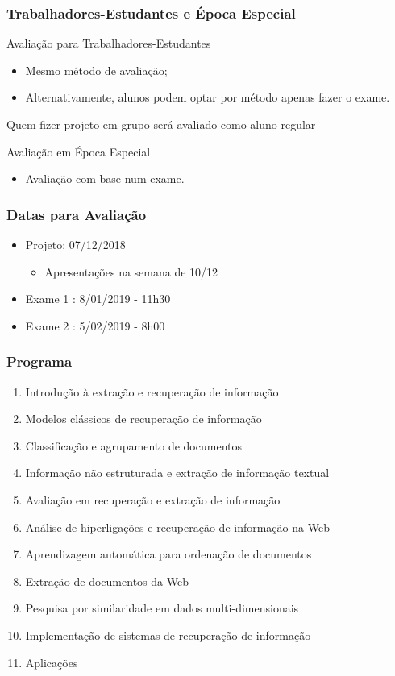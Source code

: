 \documentclass{beamer}
\begin{document}
\begin{frame} 
    \frametitle{Trabalhadores-Estudantes e Época Especial} 
   \begin{block}{Avaliação para Trabalhadores-Estudantes}
   \begin{itemize}
    \item Mesmo método de avaliação;
	\item Alternativamente, alunos podem optar por método apenas fazer o exame.
   \end{itemize}
   Quem fizer projeto em grupo será avaliado como aluno regular
   \end{block}
   \begin{block}{Avaliação em Época Especial}
   \begin{itemize}
   \item Avaliação com base num exame.
   \end{itemize}
   \end{block}
\end{frame}

\begin{frame} 
    \frametitle{Datas para Avaliação}
    \begin{itemize}
	\item Projeto: 07/12/2018
        \begin{itemize}
        \item Apresentações na semana de 10/12
        \end{itemize}
    \item Exame 1 : 8/01/2019 - 11h30
    \item Exame 2 : 5/02/2019 - 8h00
    \end{itemize}
\end{frame}


\begin{frame} 
    \frametitle{Programa}
    \begin{enumerate}
    \footnotesize
	\item Introdução à extração e recuperação de informação 
	\item Modelos clássicos de recuperação de informação
    \item Classificação e agrupamento de documentos
	\item Informação não estruturada e extração de informação textual
	\item Avaliação em recuperação e extração de informação 
	\item Análise de hiperligações e recuperação de informação na Web
    \item Aprendizagem automática para ordenação de documentos
    \item Extração de documentos da Web
	\item Pesquisa por similaridade em dados multi-dimensionais 
	\item Implementação de sistemas de recuperação de informação
	\item Aplicações
	\end{enumerate}
\end{frame}
\end{document}
